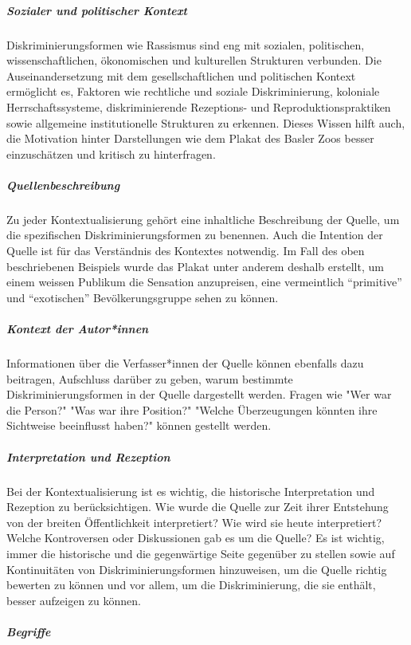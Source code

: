\documentclass[
  letterpaper,
  DIV=11,
  numbers=noendperiod]{scrartcl}
\let\oldsubparagraph\subparagraph
\renewcommand{\subparagraph}[1]{\oldsubparagraph{#1}\mbox{}}
\begin{document}
\subparagraph{Sozialer und politischer
Kontext}\label{sozialer-und-politischer-kontext}

Diskriminierungsformen wie Rassismus sind eng mit sozialen, politischen,
wissenschaftlichen, ökonomischen und kulturellen Strukturen verbunden.
Die Auseinandersetzung mit dem gesellschaftlichen und politischen
Kontext ermöglicht es, Faktoren wie rechtliche und soziale
Diskriminierung, koloniale Herrschaftssysteme, diskriminierende
Rezeptions- und Reproduktionspraktiken sowie allgemeine institutionelle
Strukturen zu erkennen. Dieses Wissen hilft auch, die Motivation hinter
Darstellungen wie dem Plakat des Basler Zoos besser einzuschätzen und
kritisch zu hinterfragen.

\subparagraph{Quellenbeschreibung}\label{quellenbeschreibung}

Zu jeder Kontextualisierung gehört eine inhaltliche Beschreibung der
Quelle, um die spezifischen Diskriminierungsformen zu benennen. Auch die
Intention der Quelle ist für das Verständnis des Kontextes notwendig. Im
Fall des oben beschriebenen Beispiels wurde das Plakat unter anderem
deshalb erstellt, um einem weissen Publikum die Sensation anzupreisen,
eine vermeintlich ``primitive'' und ``exotischen'' Bevölkerungsgruppe
sehen zu können.

\subparagraph{Kontext der Autor*innen}\label{kontext-der-autorinnen}

Informationen über die Verfasser*innen der Quelle können ebenfalls dazu
beitragen, Aufschluss darüber zu geben, warum bestimmte
Diskriminierungsformen in der Quelle dargestellt werden. Fragen wie "Wer
war die Person?" "Was war ihre Position?" "Welche Überzeugungen könnten
ihre Sichtweise beeinflusst haben?" können gestellt werden.

\subparagraph{Interpretation und
Rezeption}\label{interpretation-und-rezeption}

Bei der Kontextualisierung ist es wichtig, die historische
Interpretation und Rezeption zu berücksichtigen. Wie wurde die Quelle
zur Zeit ihrer Entstehung von der breiten Öffentlichkeit interpretiert?
Wie wird sie heute interpretiert? Welche Kontroversen oder Diskussionen
gab es um die Quelle? Es ist wichtig, immer die historische und die
gegenwärtige Seite gegenüber zu stellen sowie auf Kontinuitäten von
Diskriminierungsformen hinzuweisen, um die Quelle richtig bewerten zu
können und vor allem, um die Diskriminierung, die sie enthält, besser
aufzeigen zu können.

\subparagraph{Begriffe}\label{begriffe}
\end{document}
